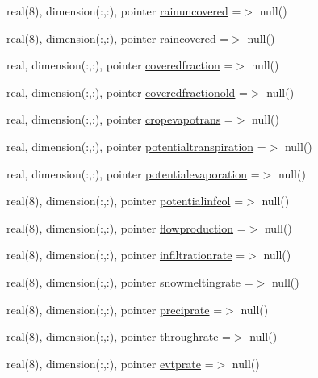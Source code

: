 \begin{DoxyCompactItemize}
\item 
real(8), dimension(\+:,\+:), pointer \mbox{\hyperlink{structmodulebasin_1_1t__basin_ab9d424e047d5990e565c403305318f79}{rainuncovered}} =$>$ null()
\item 
real(8), dimension(\+:,\+:), pointer \mbox{\hyperlink{structmodulebasin_1_1t__basin_a98c7b68b4efeb387c1852f9b16632fd1}{raincovered}} =$>$ null()
\item 
real, dimension(\+:,\+:), pointer \mbox{\hyperlink{structmodulebasin_1_1t__basin_a277f6b3a2a97dfbdcd2cd92880c38e23}{coveredfraction}} =$>$ null()
\item 
real, dimension(\+:,\+:), pointer \mbox{\hyperlink{structmodulebasin_1_1t__basin_a0fe20908ffe8f8701c5c284a9675c6a2}{coveredfractionold}} =$>$ null()
\item 
real, dimension(\+:,\+:), pointer \mbox{\hyperlink{structmodulebasin_1_1t__basin_a5ffe81b002a69081ba1a860770c65b75}{cropevapotrans}} =$>$ null()
\item 
real, dimension(\+:,\+:), pointer \mbox{\hyperlink{structmodulebasin_1_1t__basin_a1615771c551adaaa6837fba158dc1396}{potentialtranspiration}} =$>$ null()
\item 
real, dimension(\+:,\+:), pointer \mbox{\hyperlink{structmodulebasin_1_1t__basin_a6103c9b244360519a8b5b16a33f5abad}{potentialevaporation}} =$>$ null()
\item 
real(8), dimension(\+:,\+:), pointer \mbox{\hyperlink{structmodulebasin_1_1t__basin_a76f18a4d4896c771342870fa7e4c5b4c}{potentialinfcol}} =$>$ null()
\item 
real(8), dimension(\+:,\+:), pointer \mbox{\hyperlink{structmodulebasin_1_1t__basin_a41c4cc70d0207bdd34966242bcecfdbf}{flowproduction}} =$>$ null()
\item 
real(8), dimension(\+:,\+:), pointer \mbox{\hyperlink{structmodulebasin_1_1t__basin_acbf970c49103bc7a69b11b3c20e19703}{infiltrationrate}} =$>$ null()
\item 
real(8), dimension(\+:,\+:), pointer \mbox{\hyperlink{structmodulebasin_1_1t__basin_a64d8cdedb4f3da88a79a00c24d8edaad}{snowmeltingrate}} =$>$ null()
\item 
real(8), dimension(\+:,\+:), pointer \mbox{\hyperlink{structmodulebasin_1_1t__basin_aabc9188177821b4ceacd2ba868261e6e}{preciprate}} =$>$ null()
\item 
real(8), dimension(\+:,\+:), pointer \mbox{\hyperlink{structmodulebasin_1_1t__basin_a70bfbe565663dee6b450278a37ab0474}{throughrate}} =$>$ null()
\item 
real(8), dimension(\+:,\+:), pointer \mbox{\hyperlink{structmodulebasin_1_1t__basin_af5cf0fa77358dbe3229c610ae0d7c415}{evtprate}} =$>$ null()

\end{DoxyCompactItemize}
